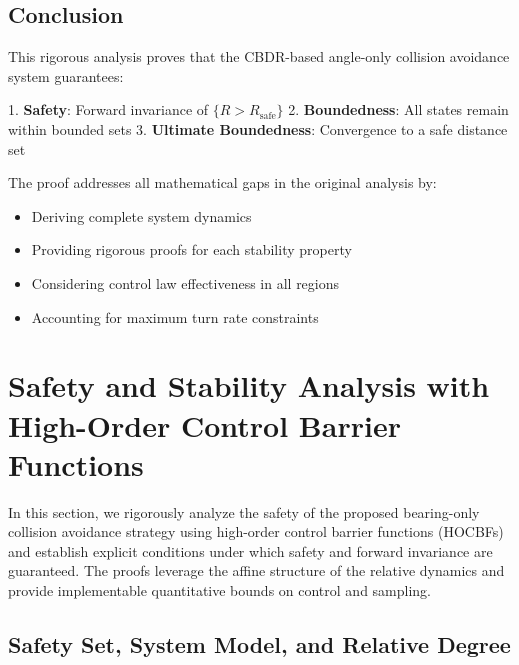 \documentclass[11pt,a4paper]{article}
\numberwithin{equation}{section}
\begin{document}
\subsection{Conclusion}

This rigorous analysis proves that the CBDR-based angle-only collision avoidance system guarantees:

1. \textbf{Safety}: Forward invariance of $\{R > R_{\text{safe}}\}$
2. \textbf{Boundedness}: All states remain within bounded sets
3. \textbf{Ultimate Boundedness}: Convergence to a safe distance set

The proof addresses all mathematical gaps in the original analysis by:
\begin{itemize}
\item Deriving complete system dynamics
\item Providing rigorous proofs for each stability property
\item Considering control law effectiveness in all regions
\item Accounting for maximum turn rate constraints
\end{itemize}


\section{Safety and Stability Analysis with High-Order Control Barrier Functions}
\label{sec:safety}

In this section, we rigorously analyze the safety of the proposed bearing-only collision avoidance strategy using high-order control barrier functions (HOCBFs) and establish explicit conditions under which safety and forward invariance are guaranteed. The proofs leverage the affine structure of the relative dynamics and provide implementable quantitative bounds on control and sampling.

\subsection{Safety Set, System Model, and Relative Degree}
\label{sec:cbf_setup}
\end{document}
